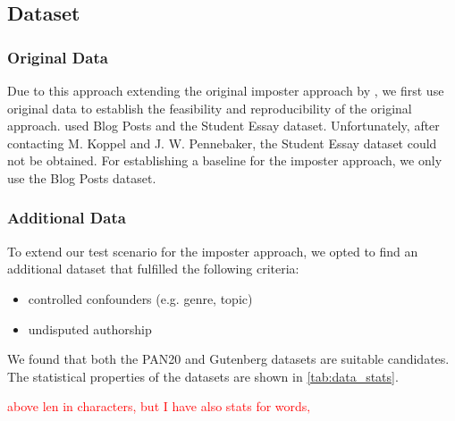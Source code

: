 \subsection{Dataset}
\label{subsec:dataset}
\newcommand{\dataGutenberg}{Gutenberg}
\newcommand{\dataBlog}{Blog Posts}
\newcommand{\dataPan}{PAN20}
\newcommand{\dataStudent}{Student Essay}
\newcommand{\dataCustom}{Custom CNN News}

\subsubsection{Original Data}
Due to this approach extending the original imposter approach by \citet{koppel_determining_2014}, 
we first use original data to establish the feasibility and reproducibility of the original approach. 
\citet{koppel_determining_2014} used \dataBlog{} and the \dataStudent{} dataset.
Unfortunately, after contacting M. Koppel and J. W. Pennebaker, the \dataStudent{} dataset could not be obtained.
For establishing a baseline for the imposter approach, we only use the \dataBlog{} dataset.

\subsubsection{Additional Data}
To extend our test scenario for the imposter approach, we opted to find an additional dataset that fulfilled the following criteria:
\begin{itemize}
    \item controlled confounders (e.g. genre, topic)
    \item undisputed authorship 
    
\end{itemize}

We found that both the \dataPan{} and \dataGutenberg{} datasets are suitable candidates.
The statistical properties of the datasets are shown in \autoref{tab:data_stats}.

\begin{table}[h]
\centering\small
\caption{Statistics of preprocessed datasets \dataPan{}, \dataBlog{} and \dataGutenberg{}.}
\label{tab:data_stats}
\end{table}
\textcolor{red}{above len in characters, but I have also stats for words‚}


